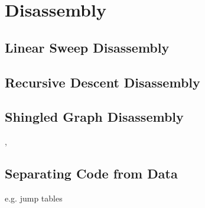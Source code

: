 

\section{Disassembly}


\subsection{Linear Sweep Disassembly}



\subsection{Recursive Descent Disassembly}



\subsection{Shingled Graph Disassembly}


\cite{singled_graph_disassembly}, \cite{superset_disassembly}


\subsection{Separating Code from Data}

e.g. jump tables



